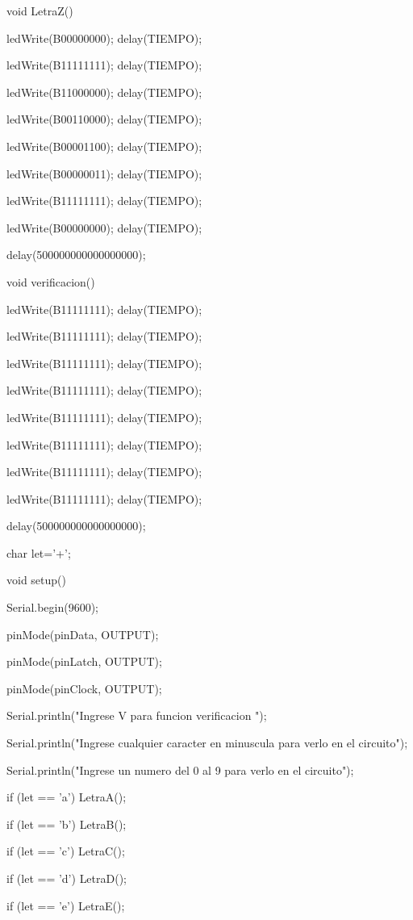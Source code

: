 \documentclass{article}
\begin{document}
void LetraZ(){

   ledWrite(B00000000); delay(TIEMPO);

   ledWrite(B11111111); delay(TIEMPO);

   ledWrite(B11000000); delay(TIEMPO);

   ledWrite(B00110000); delay(TIEMPO);

   ledWrite(B00001100); delay(TIEMPO);

   ledWrite(B00000011); delay(TIEMPO);

   ledWrite(B11111111); delay(TIEMPO);

   ledWrite(B00000000); delay(TIEMPO);

  delay(500000000000000000);}

void verificacion(){
  

   ledWrite(B11111111); delay(TIEMPO);

   ledWrite(B11111111); delay(TIEMPO);

   ledWrite(B11111111); delay(TIEMPO);

   ledWrite(B11111111); delay(TIEMPO);

   ledWrite(B11111111); delay(TIEMPO);

   ledWrite(B11111111); delay(TIEMPO);

   ledWrite(B11111111); delay(TIEMPO);

   ledWrite(B11111111); delay(TIEMPO);

  delay(500000000000000000);}

char let='+';

void setup(){

  Serial.begin(9600);

  pinMode(pinData, OUTPUT);

  pinMode(pinLatch, OUTPUT);

  pinMode(pinClock, OUTPUT);

  Serial.println("Ingrese V para funcion verificacion "); 

  Serial.println("Ingrese cualquier caracter en minuscula para 
  verlo en el circuito");
    
 Serial.println("Ingrese un numero del 0 al 9 para verlo en el circuito"); 

  
}
  if (let == 'a') {
    LetraA();}
  
  if (let == 'b'){
    LetraB();}
  
  if (let == 'c') {
    LetraC();}
  
  if (let == 'd') {
    LetraD();}
  
  if (let == 'e') {
    LetraE();}
  
\end{document}
